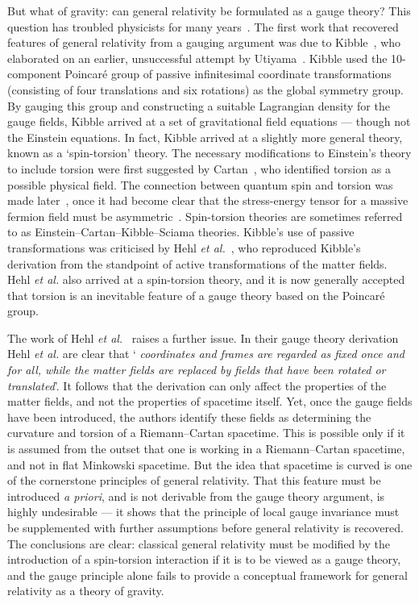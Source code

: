 \documentclass[a4paper]{article}
\numberwithin{equation}{section}
\begin{document}
But what of gravity: can general relativity be formulated as a gauge
theory?  This question has troubled physicists for many
years~\cite{uti56,kib61,iva83}.  The first work that recovered
features of general relativity from a gauging argument was due to
Kibble~\cite{kib61}, who elaborated on an earlier, unsuccessful
attempt by Utiyama~\cite{uti56}.  Kibble used the 10-component
Poincar\'{e} group of passive infinitesimal coordinate transformations
(consisting of four translations and six rotations) as the global
symmetry group.  By gauging this group and constructing a suitable
Lagrangian density for the gauge fields, Kibble arrived at a set of
gravitational field equations --- though not the Einstein equations.
In fact, Kibble arrived at a slightly more general theory, known as a
`spin-torsion' theory.  The necessary modifications to Einstein's
theory to include torsion were first suggested by Cartan~\cite{car22},
who identified torsion as a possible physical field.  The connection
between quantum spin and torsion was made
later~\cite{kib61,wey50,sci64}, once it had become clear that the
stress-energy tensor for a massive fermion field must be
asymmetric~\cite{weys47,bea63}.  Spin-torsion theories are sometimes
referred to as Einstein--Cartan--Kibble--Sciama  theories.
Kibble's use of passive transformations was criticised by Hehl {\em et
al.}~\cite{heh76}, who reproduced Kibble's derivation from the
standpoint of active transformations of the matter fields.  Hehl {\em
et al.} also arrived at a spin-torsion theory, and it is now generally
accepted that torsion is an inevitable feature of a gauge theory based
on the Poincar\'{e} group.


The work of Hehl {\em et al.}~\cite{heh76} raises a further issue.  In
their gauge theory derivation Hehl {\em et al.} are clear that `{\em
coordinates and frames are regarded as fixed once and for all, while
the matter fields are replaced by fields that have been rotated or
translated}'.  It follows that the derivation can only affect the
properties of the matter fields, and not the properties of spacetime
itself.  Yet, once the gauge fields have been introduced, the authors
identify these fields as determining the curvature and torsion of a
Riemann--Cartan spacetime.  This is possible only if it is assumed from
the outset that one is working in a Riemann--Cartan spacetime, and not
in flat Minkowski spacetime.  But the idea that spacetime is curved is
one of the cornerstone principles of general relativity.  That this
feature must be introduced {\em a priori\/}, and is not derivable from
the gauge theory argument, is highly undesirable --- it shows that the
principle of local gauge invariance must be supplemented with further
assumptions before general relativity is recovered.  The conclusions
are clear: classical general relativity must be modified by the
introduction of a spin-torsion interaction if it is to be viewed as a
gauge theory, and the gauge principle alone fails to provide a
conceptual framework for general relativity as a theory of gravity.
\end{document}

